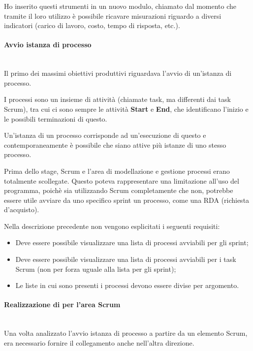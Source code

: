 Ho inserito questi strumenti in un nuovo modulo, chiamato 
dal momento che tramite il loro utilizzo è possibile ricavare misurazioni
riguardo a diversi indicatori (carico di lavoro, costo, tempo di risposta,
etc.).

\paragraph{Avvio istanza di processo} \mbox{} \\

Il primo dei massimi obiettivi produttivi riguardava l'avvio di un'istanza di
processo.

I processi sono un insieme di attività (chiamate task, ma differenti dai task
Scrum), tra cui ci sono sempre le attività \textbf{Start} e \textbf{End}, che
identificano l'inizio e le possibili terminazioni di questo.

Un'istanza di un processo corrisponde ad un'esecuzione di questo e
contemporaneamente è possibile che siano attive più istanze di uno stesso
processo.

Prima dello stage, Scrum e l'area di modellazione e gestione processi erano
totalmente scollegate. Questo poteva rappresentare una limitazione all'uso
del programma, poichè sia utilizzando Scrum completamente che non, potrebbe
essere utile avviare da uno specifico sprint un processo, come una RDA
(richiesta d'acquisto).

Nella descrizione precedente non vengono esplicitati i seguenti requisiti:

\begin{itemize}
\item Deve essere possibile visualizzare una lista di processi avviabili per
  gli sprint;
\item Deve essere possibile visualizzare una lista di processi avviabili per
  i task Scrum (non per forza uguale alla lista per gli sprint);
\item Le liste in cui sono presenti i processi devono essere divise per
  argomento.
\end{itemize}

\paragraph{Realizzazione di  per l'area Scrum} \mbox{} \\

Una volta analizzato l'avvio istanza di processo a partire da un elemento
Scrum, era necessario fornire il collegamento anche nell'altra direzione.

